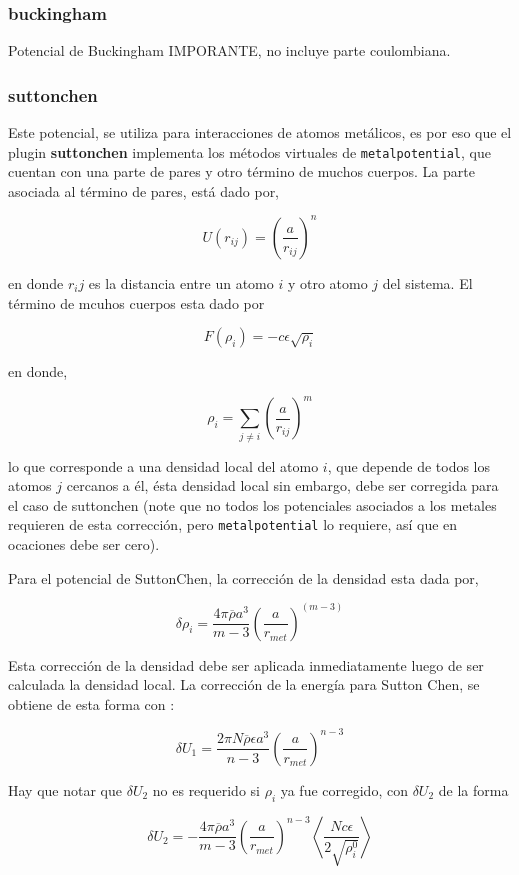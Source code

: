 \documentclass[a4paper,10pt]{scrbook}
\begin{document}
\subsubsection{buckingham}
Potencial de Buckingham IMPORANTE, no incluye parte coulombiana.
\subsubsection{suttonchen}
Este potencial, se utiliza para interacciones de atomos met\'alicos, es por eso que el plugin \textbf{suttonchen} implementa los m\'etodos virtuales de \verb|metalpotential|, que cuentan con una parte de pares y otro t\'ermino de muchos cuerpos. La parte asociada al t\'ermino de pares, est\'a dado por,

$$U(r_{ij}) = \left(\frac{a}{r_{ij}}\right)^n$$

en donde $r_ij$ es la distancia entre un atomo $i$ y otro atomo $j$ del sistema. El t\'ermino de mcuhos cuerpos esta dado por

$$F(\rho_{i}) = -c\epsilon\sqrt{\rho_i}$$

en donde,

$$\rho_i = \sum_{j\neq i} \left(\frac{a}{r_{ij}}\right)^m$$

lo que corresponde a una densidad local del atomo $i$, que depende de todos los atomos $j$ cercanos a \'el, \'esta densidad local sin embargo, debe ser corregida para el caso de suttonchen (note que no todos los potenciales asociados a los metales requieren de esta correcci\'on, pero \verb|metalpotential| lo requiere, as\'i que en ocaciones debe ser cero).

Para el potencial de SuttonChen, la correcci\'on de la densidad esta dada por,

$$\delta\rho_i=\frac{4\pi\overline{\rho}a^3}{m-3}\left(\frac{a}{r_{met}}\right)^{(m-3)}$$

Esta correcci\'on de la densidad debe ser aplicada inmediatamente luego de ser calculada la densidad local. La correcci\'on de la energ\'ia para Sutton Chen, se obtiene de esta forma con :

$$\delta U_1 = \frac{2\pi N\overline{\rho}\epsilon a^3}{n-3}\left(\frac{a}{r_{met}}\right)^{n-3}$$

Hay que notar que $\delta U_2$ no es requerido si $\rho_i$ ya fue corregido, con $\delta U_2$ de la forma

$$\delta U_2 = -\frac{4\pi\overline{\rho}a^3}{m-3}\left(\frac{a}{r_{met}}\right)^{n-3}\left<\frac{Nc\epsilon}{2\sqrt{\rho_i^0}}\right>$$
\end{document}
